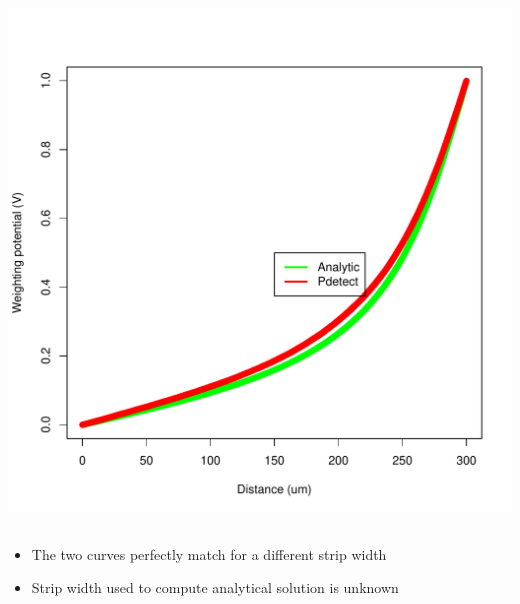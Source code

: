 \documentclass[14pt]{beamer}
\begin{document}
\begin{frame}
\begin{columns}
      \begin{column}{0.5\textwidth}
        \begin{center}
          \includegraphics[width=\textwidth]{images/semi-free.pdf}
        \end{center}

      \end{column}
    \end{columns}

\begin{itemize}
  \item The two curves perfectly match for a different strip width
  \item Strip width used to compute analytical solution is unknown
\end{itemize}

\end{frame}
\end{document}
